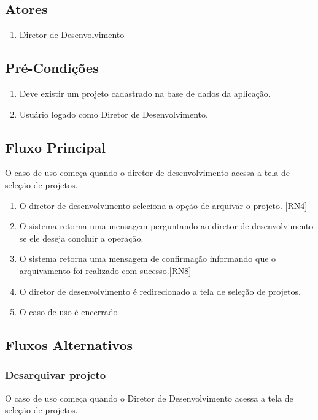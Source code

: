 \subsection{Atores}

\begin{enumerate}
  \item Diretor de Desenvolvimento
\end{enumerate}

\subsection{Pré-Condições}
\begin{enumerate}
  \item Deve existir um projeto cadastrado na base de dados da aplicação.
  \item Usuário logado como Diretor de Desenvolvimento.
\end{enumerate}

\subsection{Fluxo Principal}
O caso de uso começa quando o diretor de desenvolvimento acessa a tela de seleção de projetos.

\begin{enumerate}
  \item O diretor de desenvolvimento seleciona a opção de arquivar o projeto. [RN4]
  \item O sistema retorna uma mensagem perguntando ao diretor de desenvolvimento se ele deseja concluir a operação.
  \item O sistema retorna uma mensagem de confirmação informando que o arquivamento foi realizado com sucesso.[RN8]
  \item O diretor de desenvolvimento é redirecionado a tela de seleção de projetos.
  \item O caso de uso é encerrado
\end{enumerate}

\subsection{Fluxos Alternativos}

\subsubsection{Desarquivar projeto}
O caso de uso começa quando o Diretor de Desenvolvimento acessa a tela de seleção de projetos.


